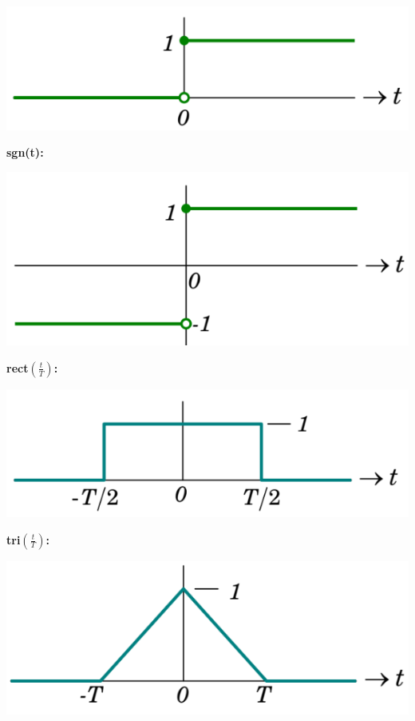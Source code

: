 \documentclass[landscape,a4paper]{extarticle}
\newenvironment{Figure}
  {\noindent\minipage{\linewidth}}
  {\endminipage\par\medskip}
\begin{document}
\begin{multicols*}{5}
    \begin{Figure}
        \centering
        \includegraphics[width=0.8\linewidth]{unitStep.png}
    \end{Figure}

    \textbf{sgn(t):}

    \begin{Figure}
        \centering
        \includegraphics[width=0.8\linewidth]{signum.png}
    \end{Figure}

    \textbf{rect$\left( \frac{t}{T}\right)$:}

    \begin{Figure}
        \centering
        \includegraphics[width=0.8\linewidth]{rect.png}
    \end{Figure}

    \textbf{tri$\left( \frac{t}{T}\right)$:}

    \begin{Figure}
        \centering
        \includegraphics[width=0.8\linewidth]{tri.png}
    \end{Figure}


\end{multicols*}
\end{document}

